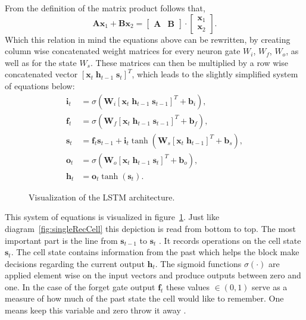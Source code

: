 From the definition of the matrix product follows that,
\begin{equation}
\mathbf{A}\mathbf{x}_1 + \mathbf{B}\mathbf{x}_2
=
\begin{bmatrix} \mathbf{A} & \mathbf{B} \end{bmatrix} \cdot
\begin{bmatrix} \mathbf{x}_1 \\ \mathbf{x}_2 \end{bmatrix}.
\end{equation}
Which this relation in mind the equations above can be rewritten, by creating column wise concatenated weight matrices for every neuron gate $W_i$, $W_f$, $W_o$, as well as for the state $W_s$. These matrices can then be multiplied by a row wise concatenated vector $[\mathbf{x}_t \; \mathbf{h}_{t-1} \; \mathbf{s}_t]^T$, which leads to the slightly simplified system of equations below:
\begin{align}
\mathbf{i}_t &= \sigma (\mathbf{W}_i [\mathbf{x}_t \; \mathbf{h}_{t-1} \; \mathbf{s}_{t-1}]^T + \mathbf{b}_i), \\
\mathbf{f}_t &= \sigma (\mathbf{W}_f [\mathbf{x}_t \; \mathbf{h}_{t-1} \; \mathbf{s}_{t-1}]^T + \mathbf{b}_f), \\
\mathbf{s}_t &= \mathbf{f}_t \mathbf{s}_{t-1} + \mathbf{i}_t \tanh( \mathbf{W}_s [\mathbf{x}_t \; \mathbf{h}_{t-1}]^T + \mathbf{b}_s ), \\
\mathbf{o}_t &= \sigma (\mathbf{W}_o [\mathbf{x}_t \; \mathbf{h}_{t-1} \; \mathbf{s}_t]^T + \mathbf{b}_o ), \\
\mathbf{h}_t &= \mathbf{o}_t \tanh(\mathbf{s}_t).
\end{align}
\begin{figure}

\caption{Visualization of the LSTM architecture.}
\label{fig:lstm}
\end{figure}
This system of equations is visualized in figure~\ref{fig:lstm}. Just like diagram~\ref{fig:singleRecCell} this depiction is read from bottom to top. The most important part is the line from $\mathbf{s}_{t-1}$ to $\mathbf{s}_{t}$ \cite{Colah2015}. It records operations on the cell state $\mathbf{s}_t$. The cell state contains information from the past which helps the block make decisions regarding the current output $\mathbf{h}_t$. The sigmoid functions $\sigma(\cdot)$ are applied element wise on the input vectors and produce outputs between zero and one. In the case of the forget gate output $\mathbf{f}_t$ these values $\in (0,1)$ serve as a measure of how much of the past state the cell would like to remember. One means keep this variable and zero throw it away \cite{Colah2015}.
